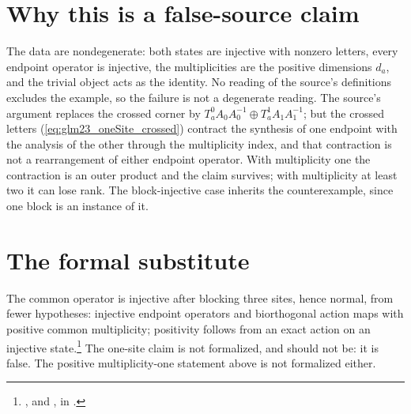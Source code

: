 \documentclass{article}
\begin{document}
\section{Why this is a false-source claim}
The data are nondegenerate: both states are injective with nonzero
letters, every endpoint operator is injective, the multiplicities are the
positive dimensions $d_a$, and the trivial object acts as the identity.
No reading of the source's definitions excludes the example, so the
failure is not a degenerate reading. The source's argument replaces the
crossed corner by $T^0_aA_0A_0^{-1}\oplus T^1_aA_1A_1^{-1}$; but the
crossed letters (\ref{eq:glm23_oneSite_crossed}) contract the synthesis of
one endpoint with the analysis of the other through the multiplicity
index, and that contraction is not a rearrangement of either endpoint
operator. With multiplicity one the contraction is an outer product and the
claim survives; with multiplicity at least two it can lose rank. The
block-injective case inherits the counterexample, since one block is an
instance of it.

\section{The formal substitute}
The common operator is injective after blocking three sites, hence
normal, from fewer hypotheses: injective endpoint operators and
biorthogonal action maps with positive common multiplicity; positivity
follows from an exact action on an injective state.\footnote{%
    ,
     and
    ,
    in .}
The one-site claim is not formalized,
and should not be: it is false. The positive multiplicity-one statement
above is not formalized either.



\end{document}
